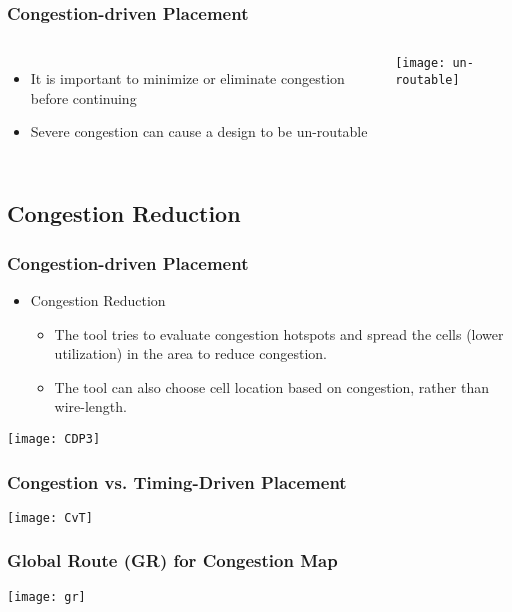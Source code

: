 \documentclass[compress]{beamer}
\begin{document}
\begin{frame}
	\frametitle{Congestion-driven Placement}
		\begin{columns}
		\begin{itemize}
			\item It is important to minimize or eliminate congestion before continuing
			
			\item Severe congestion can cause a design to be un-routable
			
		\end{itemize}
		\begin{center}
			\texttt{[image: un-routable]}
		\end{center}
	\end{columns}
\end{frame}

\subsection[Solution]{Congestion Reduction}
\begin{frame}
	\frametitle{Congestion-driven Placement}

		\begin{itemize}
			\item Congestion Reduction
			\begin{itemize}
				\item The tool tries to evaluate congestion hotspots
				and spread the cells (lower utilization) in the
				area to reduce congestion.
				\item The tool can also choose cell location based
				on congestion, rather than wire-length.
			\end{itemize}
			
		\end{itemize}
	
		\begin{center}
			\texttt{[image: CDP3]}
		\end{center}

\end{frame}

\begin{frame}
	\frametitle{Congestion vs. Timing-Driven Placement}
	\begin{center}
		\texttt{[image: CvT]}
	\end{center}
\end{frame}
\begin{frame}
	\frametitle{Global Route (GR) for Congestion Map}
	\begin{center}
		\texttt{[image: gr]}
	\end{center}
\end{frame}
\end{document}
